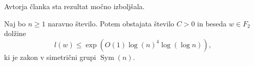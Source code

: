 
Avtorja članka \cite{Kozma_Thom_2016} sta rezultat močno izboljšala.
\begin{izrek}\label{izr_kozma_thom_glavni}
    Naj bo $n \ge 1$ naravno število. Potem obstajata število $C > 0$ in beseda $w \in F_2$ dolžine 
    \begin{equation*}
        l(w)  \le \exp(O(1) \log(n)^4 \log (\log n)),
    \end{equation*}
    ki je zakon v simetrični grupi $\operatorname{Sym}(n)$. 
\end{izrek}

